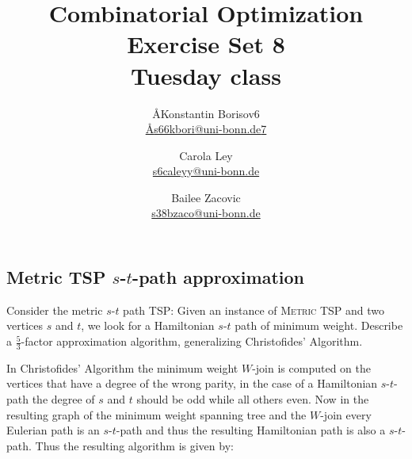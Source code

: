 \documentclass{article}
\title{Combinatorial Optimization \\ Exercise Set 8 \\ Tuesday class}
\author{
  \AA{Konstantin Borisov}{6} \\
  \href{mailto:\AA{s66kbori@uni-bonn.de}{7}}{\AA{s66kbori@uni-bonn.de}{7}}
  \and
  Carola Ley \\
  \href{mailto:s6caleyy@uni-bonn.de}{s6caleyy@uni-bonn.de}
  \and
  Bailee Zacovic \\
  \href{mailto:s38bzaco@uni-bonn.de}{s38bzaco@uni-bonn.de}
}
\begin{document}
  \maketitle

  \setcounter{section}{8}
  \subsection{Metric TSP $s$-$t$-path approximation}
  \begin{centerframebox}
    Consider the metric $s$-$t$ path TSP: Given an instance of \textsc{Metric TSP}
    and two vertices $s$ and $t$, we look for a Hamiltonian $s$-$t$ path of minimum
    weight. Describe a $\frac{5}{3}$-factor approximation algorithm, generalizing Christofides'
    Algorithm.
  \end{centerframebox}
  In Christofides' Algorithm  the minimum weight $W$-join is computed on the vertices that have a degree of the wrong parity, in the case of a Hamiltonian $s$-$t$-path the degree of $s$ and $t$ should be odd while all others even. Now in the resulting graph of the minimum weight spanning tree and the $W$-join every Eulerian path is an $s$-$t$-path and thus the resulting Hamiltonian path is also a $s$-$t$-path. Thus the resulting algorithm is given by:
\end{document}
